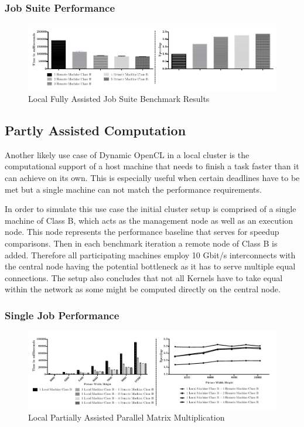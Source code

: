 \subsubsection*{Job Suite Performance}

\begin{figure}[H]
	
	\includegraphics[width=1.0\textwidth]{images/local_fully_assisted_full_benchmark.pdf}
	\centering
	\caption{Local Fully Assisted Job Suite Benchmark Results}
	\label{img:local_fully_assisted_benchmark_results}
\end{figure}

\subsection{Partly Assisted Computation}

Another likely use case of Dynamic OpenCL in a local cluster is the computational support of a host machine that needs to finish a task faster than it can achieve on its own. This is especially useful when certain deadlines have to be met but a single machine can not match the performance requirements.

In order to simulate this use case the initial cluster setup is comprised of a single machine of Class B, which acts as the management node as well as an execution node. This node represents the performance baseline that serves for speedup comparisons. Then in each benchmark iteration a remote node of Class B is added. Therefore all participating machines employ 10 Gbit/s interconnects with the central node having the potential bottleneck as it has to serve multiple equal connections. The setup also concludes that not all Kernels have to take equal within the network as some might be computed directly on the central node.

\subsubsection*{Single Job Performance}
\label{single_job_performance}

\begin{figure}[H]
	
	\includegraphics[width=1.0\textwidth]{images/local_partially_assisted_matrix.pdf}
	\centering
	\caption{Local Partially Assisted Parallel Matrix Multiplication}
	\label{img:parallel_matrix}
\end{figure}

